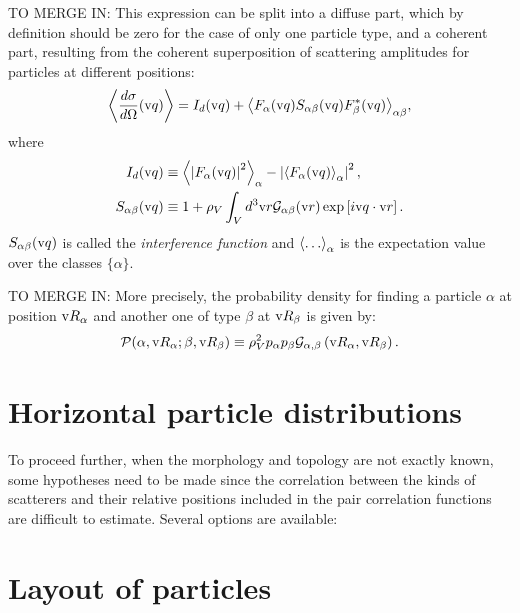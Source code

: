 TO MERGE IN:
This expression can be split into a diffuse part, which by definition should be zero for the case of only one particle type, and a coherent part, resulting from the coherent superposition of scattering amplitudes for particles at different positions:
\begin{equation*}
  \left\langle \frac{d\sigma}{d\Omega}(\text{v}{q}) \right\rangle
  = I_d(\text{v}{q}) + {\left\langle F_\alpha (\text{v}{q} ) S_{\alpha\beta} (\text{v}{q}) F_\beta^* (\text{v}{q})
               \right\rangle}_{\alpha\beta},
\end{equation*}
where
\begin{align*}
  I_d(\text{v}{q}) &
  \equiv {\ensuremath{\left\langle}\left\rvert F_\alpha (\text{v}{q}) \right\rvert^2\ensuremath{\right\rangle}}_{\alpha}
       - \left\lvert {\ensuremath{\left\langle}F_\alpha (\text{v}{q})\ensuremath{\right\rangle}}_{\alpha} \right\rvert^2, \\
  S_{\alpha\beta} (\text{v}{q}) &\equiv 1 + \rho_V \int_V d^3\text{v}{r}\mathcal{G}_{\alpha\beta}(\text{v}{r}) \exp \left[ i\text{v}{q}\cdot \text{v}{r} \right].
\end{align*}
$S_{\alpha\beta} (\text{v}{q})$ is called the \emph{interference function} and $\bra\dotso\ket_\alpha$ is the expectation value over the classes $\lbrace \alpha\rbrace$.


TO MERGE IN:
More precisely, the probability density for finding a particle $\alpha$ at position $\text{v}{R}_\alpha$ and another one of type $\beta$ at $\text{v}{R}_\beta$ is given by:
\begin{equation*}
  \mathcal{P}(\alpha, \text{v}{R}_\alpha ; \beta , \text{v}{R}_\beta ) \equiv \rho_V^2 p_\alpha p_\beta \mathcal{G}_{\alpha ,\beta}\left( \text{v}{R}_{\alpha} , \text{v}{R}_{\beta} \right).
\end{equation*}


\section{Horizontal particle distributions}

To proceed further, when the morphology and topology are not exactly known, some hypotheses need to be made since the correlation between the kinds of scatterers and their relative positions included in the pair correlation functions are difficult to estimate. Several options are available:



\section{Layout of particles}\label{sec:partlayout}

